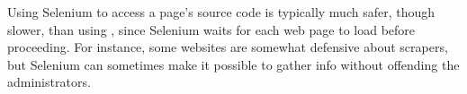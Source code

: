 \begin{comment} %
\begin{problem} 
The arXiv (pronounced ``archive'') is an online repository of scientific publications, hosted by Cornell University.
Write a function that accepts a string to serve as a search query defaulting to \li{linkedin}.
Use Selenium to enter the query into the search bar of \url{https://arxiv.org} and press Enter.
The resulting page has up to 50 links to the PDFs of technical papers that match the query.
Gather these URLs, then continue to the next page (if there are more results) and continue gathering links until obtaining at most 150 URLs.
Return the list of URLs.
\end{problem}
\end{comment}
\begin{info}
Using Selenium to access a page's source code is typically much safer, though slower, than using , since Selenium waits for each web page to load before proceeding.
For instance, some websites are somewhat defensive about scrapers, but Selenium can sometimes make it possible to gather info without offending the administrators.
\end{info}

\begin{comment} %
\begin{problem}
The NBA has live statistics \url{http://stats.nba.com/}.
Use Selenium to return a list of the \li{a} tags containing each of the 30 NBA teams.
Use the \li{find_all()} method in conjunction with whatever unique identifiers get you the correct tags.
\\(Hint: class and tag name are a good start). %

\begin{itemize}
\item The column titles are Name, HW\%, AW\%, where Name is each team name, HW\% is the Home Win \%, and AW\% is the Away Win \%.
\item Each row represents a different basketball team, with its home and away win percentages.
\end{itemize}
Hint: You will need to use Selenium to access each teams website using the links from the tags found in problem \ref{prob:scraping-bball}.
If the websites do not load properly, consider a \li{try-except} clause like the one suggested previously.
\end{problem}
\end{comment}

